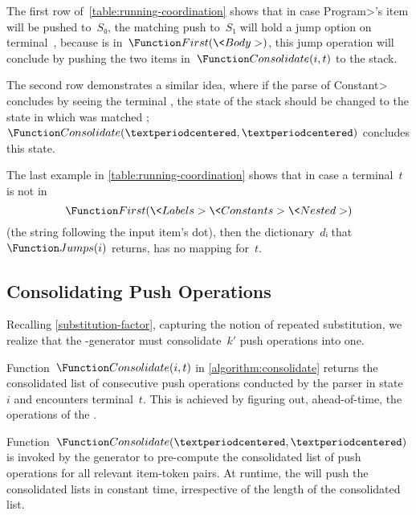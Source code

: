 The first row of~\cref{table:running-coordination} shows that in case
\<Program>'s item will be pushed to~$S₀$, the matching push to~$S₁$ will hold
a jump option on terminal~, because  is in~$\Function
First(\<Body>)$, this jump operation will conclude by pushing the two items
in~$\Function Consolidate(i,t)$ to the stack.

The second row demonstrates a similar idea, where if the parse of \<Constant>
concludes by seeing the terminal \cc{;}, the state of the stack should be
changed to the state in which \cc{;} was matched ;~$\Function
Consolidate(·,·)$ concludes this state.

The last example in \cref{table:running-coordination} shows that in case a
terminal~$t$ is not in \[ \Function First(\<Labels> \<Constants> \<Nested>)\]
(the string following the input item's dot), then the dictionary~$dᵢ$
that~$\Function Jumps(i)$ returns, has no mapping for~$t$.

\subsection{Consolidating Push Operations}
\label{subsection:consolidate}
Recalling \cref{substitution-factor}, capturing the notion of
repeated substitution, we realize that the \RLLp-generator
must consolidate~$k'$ push operations into one.

Function~$\Function Consolidate(i,t)$ in \cref{algorithm:consolidate}
returns the consolidated list of consecutive push operations conducted
by the \RLLp parser in state~$i$ and encounters terminal~$t$.
This is achieved by figuring out, ahead-of-time,
the operations of the \LLp.

Function~$\Function Consolidate(·,·)$ is invoked by the \RLLp generator to
pre-compute the consolidated list of push operations for all relevant
item-token pairs. At runtime, the \RLLp will push the consolidated lists in
constant time, irrespective of the length of the consolidated list.


